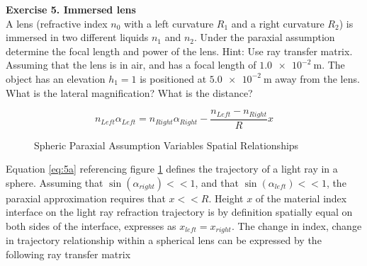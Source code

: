 \documentclass[main.tex]{subfiles}
\begin{document}
\textbf{Exercise 5. Immersed lens}\\

 A lens (refractive index $n_0$ with a left curvature $R_1$ and a right curvature $R_2$) is immersed in two different liquids $n_1$ and $n_2$. Under the paraxial assumption determine the focal length and power of the lens. Hint: Use ray transfer matrix. Assuming that the lens is in air, and has a focal length of $\SI{1.0e-2}{\meter}$. The object has an elevation $h_1=1$ is positioned at $\SI{5.0e-2}{\meter}$ away from the lens. What is the lateral magnification? What is the distance?


\begin{equation}\label{eq:5a}
n_{Left} \alpha_{Left} = n_{Right} \alpha_{Right} - \frac{n_{Left} - n_{Right}}{R}x
\end{equation}

\begin{figure}
\centering{}
\caption{Spheric Paraxial Assumption Variables Spatial Relationships}
\label{fig:5b}
\end{figure}

Equation \ref{eq:5a} referencing figure \ref{fig:5b} defines the trajectory of a light ray in a sphere. Assuming that $\sin(\alpha_{right}) << 1$, and that $\sin(\alpha_{left}) << 1$, the paraxial approximation requires that $x<<R$. Height $x$ of the material index interface on the light ray refraction trajectory is by definition spatially equal on both sides of the interface, expresses as $ x_{left}=x_{right}$. The change in index, change in trajectory relationship within a spherical lens can be expressed by the following ray transfer matrix\\
\end{document}
